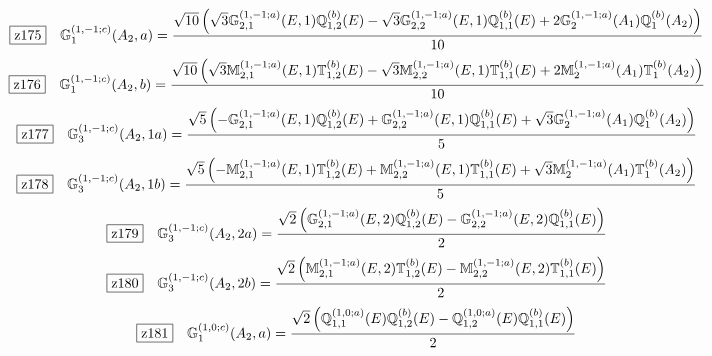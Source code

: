 \documentclass[fleqn,10pt,landscape]{jsarticle}
\begin{document}
\begin{dmath*}
\hspace*{3mm}\fbox{z175}\quad \mathbb{G}_{1}^{(1,-1;c)}(A_{2},a)=\frac{\sqrt{10} \left(\sqrt{3} \mathbb{G}_{2,1}^{(1,-1;a)}(E,1) \mathbb{Q}_{1,2}^{(b)}(E) - \sqrt{3} \mathbb{G}_{2,2}^{(1,-1;a)}(E,1) \mathbb{Q}_{1,1}^{(b)}(E) + 2 \mathbb{G}_{2}^{(1,-1;a)}(A_{1}) \mathbb{Q}_{1}^{(b)}(A_{2})\right)}{10}
\end{dmath*}
\begin{dmath*}
\hspace*{3mm}\fbox{z176}\quad \mathbb{G}_{1}^{(1,-1;c)}(A_{2},b)=\frac{\sqrt{10} \left(\sqrt{3} \mathbb{M}_{2,1}^{(1,-1;a)}(E,1) \mathbb{T}_{1,2}^{(b)}(E) - \sqrt{3} \mathbb{M}_{2,2}^{(1,-1;a)}(E,1) \mathbb{T}_{1,1}^{(b)}(E) + 2 \mathbb{M}_{2}^{(1,-1;a)}(A_{1}) \mathbb{T}_{1}^{(b)}(A_{2})\right)}{10}
\end{dmath*}
\begin{dmath*}
\hspace*{3mm}\fbox{z177}\quad \mathbb{G}_{3}^{(1,-1;c)}(A_{2},1a)=\frac{\sqrt{5} \left(- \mathbb{G}_{2,1}^{(1,-1;a)}(E,1) \mathbb{Q}_{1,2}^{(b)}(E) + \mathbb{G}_{2,2}^{(1,-1;a)}(E,1) \mathbb{Q}_{1,1}^{(b)}(E) + \sqrt{3} \mathbb{G}_{2}^{(1,-1;a)}(A_{1}) \mathbb{Q}_{1}^{(b)}(A_{2})\right)}{5}
\end{dmath*}
\begin{dmath*}
\hspace*{3mm}\fbox{z178}\quad \mathbb{G}_{3}^{(1,-1;c)}(A_{2},1b)=\frac{\sqrt{5} \left(- \mathbb{M}_{2,1}^{(1,-1;a)}(E,1) \mathbb{T}_{1,2}^{(b)}(E) + \mathbb{M}_{2,2}^{(1,-1;a)}(E,1) \mathbb{T}_{1,1}^{(b)}(E) + \sqrt{3} \mathbb{M}_{2}^{(1,-1;a)}(A_{1}) \mathbb{T}_{1}^{(b)}(A_{2})\right)}{5}
\end{dmath*}
\begin{dmath*}
\hspace*{3mm}\fbox{z179}\quad \mathbb{G}_{3}^{(1,-1;c)}(A_{2},2a)=\frac{\sqrt{2} \left(\mathbb{G}_{2,1}^{(1,-1;a)}(E,2) \mathbb{Q}_{1,2}^{(b)}(E) - \mathbb{G}_{2,2}^{(1,-1;a)}(E,2) \mathbb{Q}_{1,1}^{(b)}(E)\right)}{2}
\end{dmath*}
\begin{dmath*}
\hspace*{3mm}\fbox{z180}\quad \mathbb{G}_{3}^{(1,-1;c)}(A_{2},2b)=\frac{\sqrt{2} \left(\mathbb{M}_{2,1}^{(1,-1;a)}(E,2) \mathbb{T}_{1,2}^{(b)}(E) - \mathbb{M}_{2,2}^{(1,-1;a)}(E,2) \mathbb{T}_{1,1}^{(b)}(E)\right)}{2}
\end{dmath*}
\begin{dmath*}
\hspace*{3mm}\fbox{z181}\quad \mathbb{G}_{1}^{(1,0;c)}(A_{2},a)=\frac{\sqrt{2} \left(\mathbb{Q}_{1,1}^{(1,0;a)}(E) \mathbb{Q}_{1,2}^{(b)}(E) - \mathbb{Q}_{1,2}^{(1,0;a)}(E) \mathbb{Q}_{1,1}^{(b)}(E)\right)}{2}
\end{dmath*}
\end{document}
